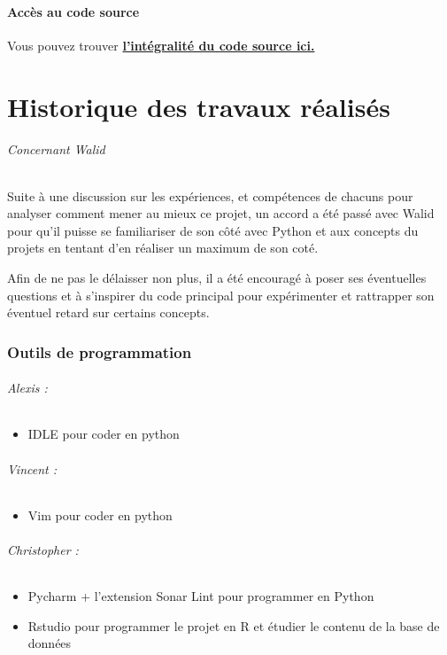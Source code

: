 			\subsection{Accès au code source}
			Vous pouvez trouver \href{https://github.com/helldragger/PolTron-La-coalition}{
			\bfseries \color{link} l'intégralité du code source ici.}
		\part{Historique des travaux réalisés}
		
		
		\paragraph{Concernant Walid}
		
		Suite à une discussion sur les expériences, et compétences de chacuns pour analyser comment mener au mieux ce projet, un accord a été passé avec Walid pour qu'il puisse se familiariser de son côté avec Python et aux concepts du projets en tentant d'en réaliser un maximum de son coté.
		
		Afin de ne pas le délaisser non plus, il a été encouragé à poser ses éventuelles questions et à s'inspirer du code principal pour expérimenter et rattrapper son éventuel retard sur certains concepts.
		
		
			\section{Outils de programmation}
				\paragraph{Alexis :}
				\begin{itemize}
					\item IDLE pour coder en python
				\end{itemize}
				\paragraph{Vincent :}
				\begin{itemize}
					\item Vim pour coder en python
				\end{itemize}
				\paragraph{Christopher :}
				\begin{itemize}
					\item Pycharm + l'extension Sonar Lint pour programmer en Python
					\item Rstudio pour programmer le projet en R et étudier le contenu de la base de données
				\end{itemize}

